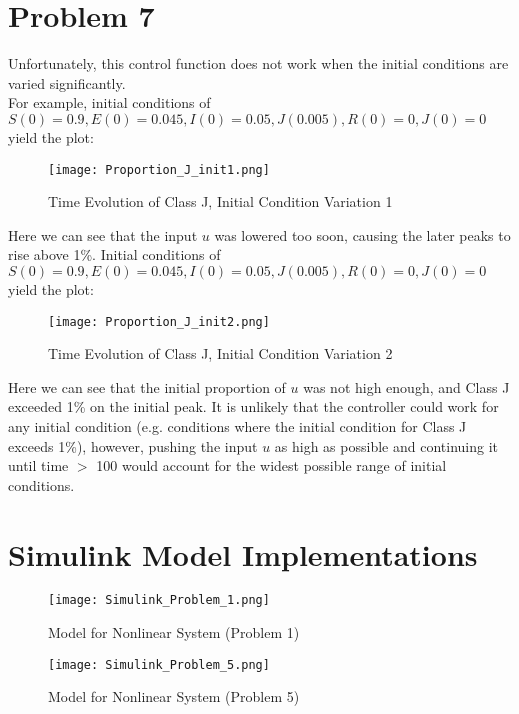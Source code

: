 \documentclass[letterpaper,twocolumn,10pt]{article}
\begin{document}
\section*{Problem 7}
Unfortunately, this control function does not work when the initial conditions are varied significantly. \\
For example, initial conditions of \(S(0) = 0.9, E(0) = 0.045, I(0) = 0.05, J(0.005), R(0) = 0, J(0) = 0\) yield the plot:

\begin{figure}[htb!]
\centering
\texttt{[image: Proportion\_J\_init1.png]}
\caption{Time Evolution of Class J, Initial Condition Variation 1 \label{fig:Proportion_J_init1}}
\end{figure}

Here we can see that the input \(u\) was lowered too soon, causing the later peaks to rise above 1\%.
Initial conditions of \(S(0) = 0.9, E(0) = 0.045, I(0) = 0.05, J(0.005), R(0) = 0, J(0) = 0\) yield the plot:

\begin{figure}[htb!]
\centering
\texttt{[image: Proportion\_J\_init2.png]}
\caption{Time Evolution of Class J, Initial Condition Variation 2 \label{fig:Proportion_J_init2}}
\end{figure}
\vspace{2mm}
Here we can see that the initial proportion of \(u\) was not high enough, and Class J exceeded 1\% on the initial peak.\hspace*{\fill}
\vspace{3mm}
\linebreak
It is unlikely that the controller could work for any initial condition (e.g. conditions where the initial condition for Class J exceeds 1\%), however, pushing the input \(u\) as high as possible and continuing it until time \(>\) 100 would account for the widest possible range of initial conditions.

\section*{Simulink Model Implementations}
\begin{figure}[htb!]
\centering
\texttt{[image: Simulink\_Problem\_1.png]}
\caption{Model for Nonlinear System (Problem 1)\label{fig:Simulink_Problem_1}}
\end{figure}

\begin{figure}[htb!]
\centering
\texttt{[image: Simulink\_Problem\_5.png]}
\caption{Model for Nonlinear System (Problem 5)\label{fig:Simulink_Problem_5}}
\end{figure}
\end{document}
